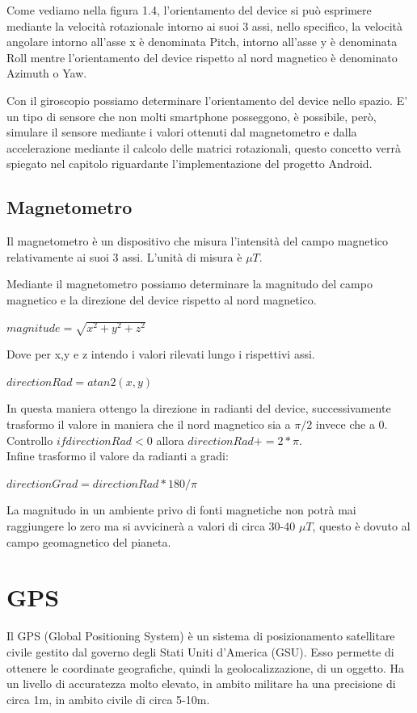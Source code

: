 \documentclass[12pt,a4paper,openright,twoside]{report}
\begin{document}
Come vediamo nella figura 1.4, l'orientamento del device si può esprimere mediante la velocità rotazionale intorno ai suoi 3 assi, nello specifico, la velocità angolare intorno all'asse x è denominata Pitch, intorno all'asse y è denominata Roll mentre l'orientamento del device rispetto al nord magnetico è denominato Azimuth o Yaw.


Con il giroscopio possiamo determinare l'orientamento del device nello spazio.
E' un tipo di sensore che non molti smartphone posseggono, è possibile, però, simulare il sensore mediante i valori ottenuti dal magnetometro e dalla accelerazione mediante il calcolo delle matrici rotazionali, questo concetto verrà spiegato nel capitolo riguardante l'implementazione del progetto Android.
\subsection{Magnetometro}
Il magnetometro è un dispositivo che misura l'intensità del campo magnetico relativamente ai suoi 3 assi. L'unità di misura è $\mu T$. 


Mediante il magnetometro possiamo determinare la magnitudo del campo magnetico e la direzione del device rispetto al nord magnetico.

\begin{center}
$ magnitude = \sqrt{ x^2 + y^2 + z^2}$
\end{center}
Dove per x,y e z intendo i valori rilevati lungo i rispettivi assi.


\begin{center}
$directionRad = atan2(x,y)$
\end{center}


In questa maniera ottengo la direzione in radianti del device, successivamente trasformo il valore in maniera che il nord magnetico sia a $ \pi / 2$ invece che a 0. Controllo $if directionRad < 0 $ allora $directionRad += 2* \pi $. \\
Infine trasformo il valore da radianti a gradi:

\begin{center}
$directionGrad = directionRad * 180/ \pi$
\end{center}

La magnitudo in un ambiente privo di fonti magnetiche non potrà mai raggiungere lo zero ma si avvicinerà a valori di circa 30-40 $\mu T$, questo è dovuto al campo geomagnetico del pianeta.

\section {GPS}
Il GPS (Global Positioning System) è un sistema di posizionamento satellitare civile gestito dal governo degli Stati Uniti d'America (GSU). Esso permette di ottenere le coordinate geografiche, quindi la geolocalizzazione, di un oggetto.
Ha un livello di accuratezza molto elevato, in ambito militare ha una precisione di circa 1m, in ambito civile di circa 5-10m.
\end{document}
